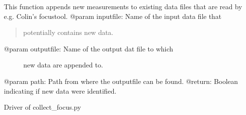 \documentclass[letterpaper,10pt,english]{sphinxmanual}
\begin{document}

\begin{fulllineitems}
\label{SamPy.focus:SamPy.focus.collect_focus.append_to_FocusModel}
This function appends new measurements to existing data
files that are read by e.g. Colin's focustool.
@param inputfile: Name of the input data file that
\begin{quote}

potentially contains new data.
\end{quote}
\begin{description}
\item[{@param outputfile: Name of the output dat file to which}] \leavevmode
new data are appended to.

\end{description}

@param path: Path from where the outputfile can be found.
@return: Boolean indicating if new data were identified.

\end{fulllineitems}



\begin{fulllineitems}
\label{SamPy.focus:SamPy.focus.collect_focus.findZernikes}
\end{fulllineitems}



\begin{fulllineitems}
\label{SamPy.focus:SamPy.focus.collect_focus.main}
Driver of collect\_focus.py

\end{fulllineitems}



\begin{fulllineitems}
\label{SamPy.focus:SamPy.focus.collect_focus.modList}
\end{fulllineitems}
\end{document}
